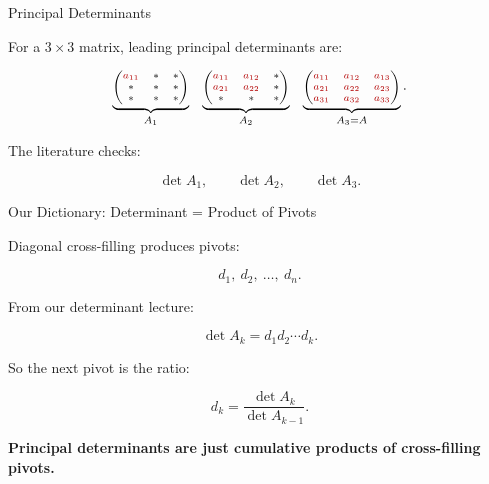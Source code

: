 \documentclass[10pt]{beamer}
\theoremstyle{definition}
\newcommand{\x}[1]{\alert{\textbf{#1}}}
\newcommand{\rd}[1]{{\color{red!70!black}#1}}
\begin{document}
\begin{frame}{Principal Determinants}

For a $3\times3$ matrix, leading principal determinants are:

\[
\scriptsize
\underbrace{
\begin{pmatrix}
\rd{a_{11}}&*&*\\
*&*&*\\
*&*&*
\end{pmatrix}}_{A_1}
\quad
\underbrace{
\begin{pmatrix}
\rd{a_{11}}&\rd{a_{12}}&*\\
\rd{a_{21}}&\rd{a_{22}}&*\\
*&*&*
\end{pmatrix}}_{A_2}
\quad
\underbrace{
\begin{pmatrix}
\rd{a_{11}}&\rd{a_{12}}&\rd{a_{13}}\\
\rd{a_{21}}&\rd{a_{22}}&\rd{a_{23}}\\
\rd{a_{31}}&\rd{a_{32}}&\rd{a_{33}}
\end{pmatrix}}_{A_3=A}.
\]

\vfill

The literature checks:

$$
\det A_1,\qquad \det A_2,\qquad \det A_3.
$$

\end{frame}


\begin{frame}{Our Dictionary: Determinant = Product of Pivots}

Diagonal cross-filling produces pivots:

$$
d_1,\ d_2,\ \ldots,\ d_n.
$$

\vfill

From our determinant lecture:

$$
\boxed{
\det A_k=d_1d_2\cdots d_k.
}
$$

\vfill

So the next pivot is the ratio:

$$
\boxed{
d_k=\frac{\det A_k}{\det A_{k-1}}.
}
$$

\vfill

\begin{center}
\x{Principal determinants are just cumulative products of cross-filling pivots.}
\end{center}

\end{frame}
\end{document}

